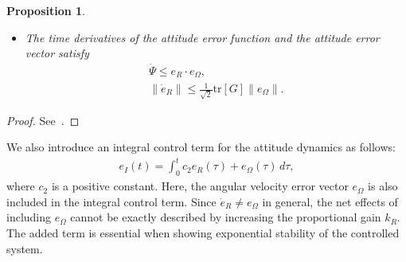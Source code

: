 \documentclass[twocolumn,letterpaper]{IEEEAerospaceCLS}  %
\newtheorem{prop}{Proposition}
\begin{document}
\begin{prop}
\begin{itemize}
\begin{align*}
h_4 & = \max\{g_1+g_2,g_2+g_3,g_3+g_1\}\\
h_5 & = \min\{(g_1+g_2)^2,(g_2+g_3)^2,(g_3+g_1)^2\}.
\end{align*}
\item[(vi)] The time derivatives of the attitude error function and the attitude error vector satisfy
\begin{gather}
\dot \Psi \leq e_R\cdot e_\Omega,\\
\|\dot e_R\| \leq \frac{1}{\sqrt{2}}{\mathrm{tr}}[G]\|e_\Omega\|.
\end{gather}
\end{itemize}
\end{prop}
\begin{proof}
See~\cite{LeeITCST13}.
\end{proof}
We also introduce an integral control term for the attitude dynamics as follows:
\begin{align}
e_I(t) = \int_0^t c_2 e_R(\tau) + e_\Omega(\tau)\,d\tau,\label{eqn:eI}
\end{align}
where $c_2$ is a positive constant. Here, the angular velocity error vector $e_\Omega$ is also included in the integral control term. Since $\dot e_R \neq e_\Omega$ in general, the net effects of including $e_\Omega$ cannot be exactly described by increasing the proportional gain $k_R$. The added term is essential when showing exponential stability of the controlled system. 
\end{document}
